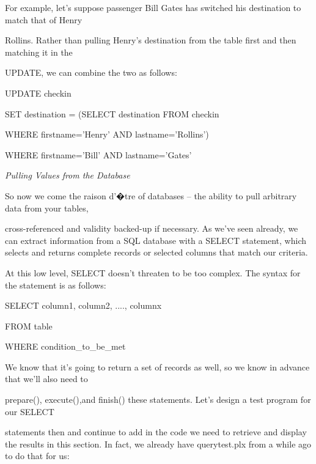 \documentclass[a4paper,11pt]{book}
\begin{document}
\noindent For example, let's suppose passenger Bill Gates has switched his destination to match that of Henry

\noindent Rollins. Rather than pulling Henry's destination from the table first and then matching it in the

\noindent UPDATE, we can combine the two as follows:

\noindent 

\noindent UPDATE checkin

\noindent SET destination = (SELECT destination FROM checkin

\noindent WHERE firstname='Henry' AND lastname='Rollins')

\noindent WHERE  firstname='Bill' AND lastname='Gates'

\noindent 

\noindent \textit{Pulling Values from the Database}

\noindent So now we come the raison d'�tre of databases -- the ability to pull arbitrary data from your tables,

\noindent cross-referenced and validity backed-up if necessary. As we've seen already, we can extract information from a SQL database with a SELECT statement, which selects and returns complete records or selected columns that match our criteria.

\noindent 

\noindent At this low level, SELECT doesn't threaten to be too complex. The syntax for the statement is as follows:

\noindent 

\noindent SELECT column1, column2, ...., columnx

\noindent FROM table

\noindent WHERE condition\_to\_be\_met


\noindent 

\noindent 

\noindent We know that it's going to return a set of records as well, so we know in advance that we'll also need to

\noindent prepare(), execute(),and finish() these statements. Let's design a test program for our SELECT

\noindent statements then and continue to add in the code we need to retrieve and display the results in this section. In fact, we already have querytest.plx from a while ago to do that for us:
\end{document}
